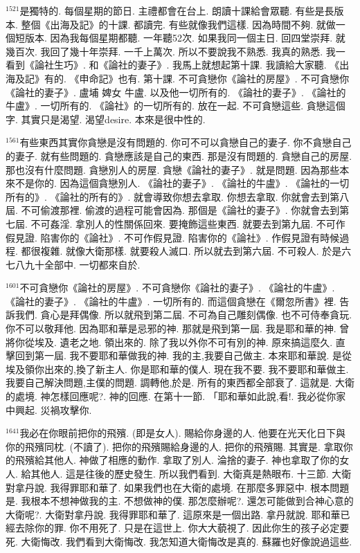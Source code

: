 \documentclass{book}
\begin{document}
$^{1521}$是獨特的.
每個星期的節日.
主禮都會在台上.
朗讀十課給會眾聽.
有些是長版本.
整個《出海及記》的十課.
都讀完.
有些就像我們這樣.
因為時間不夠.
就做一個短版本.
因為我每個星期都聽.
一年聽52次.
如果我同一個主日.
回四堂崇拜.
就幾百次.
我回了幾十年崇拜.
一千上萬次.
所以不要說我不熟悉.
我真的熟悉.
我一看到《論社生巧》.
和《論社的妻子》.
我馬上就想起第十課.
我讀給大家聽.
《出海及記》有的.
《申命記》也有.
第十課.
不可貪戀你《論社的房屋》.
不可貪戀你《論社的妻子》.
盧埔 婢女 牛盧.
以及他一切所有的.
《論社的妻子》.
《論社的牛盧》.
一切所有的.
《論社》的一切所有的.
放在一起.
不可貪戀這些.
貪戀這個字.
其實只是渴望.
渴望desire.
本來是很中性的.

$^{1561}$有些東西其實你貪戀是沒有問題的.
你可不可以貪戀自己的妻子.
你不貪戀自己的妻子.
就有些問題的.
貪戀應該是自己的東西.
那是沒有問題的.
貪戀自己的房屋.
那也沒有什麼問題.
貪戀別人的房屋.
貪戀《論社的妻子》.
就是問題.
因為那些本來不是你的.
因為這個貪戀別人.
《論社的妻子》.
《論社的牛盧》.
《論社的一切所有的》.
《論社的所有的》.
就會導致你想去拿取.
你想去拿取.
你就會去到第八屆.
不可偷渡那裡.
偷渡的過程可能會因為.
那個是《論社的妻子》.
你就會去到第七屆.
不可姦淫.
拿別人的性關係回來.
要掩飾這些東西.
就要去到第九屆.
不可作假見證.
陷害你的《論社》.
不可作假見證.
陷害你的《論社》.
作假見證有時候過程.
都很複雜.
就像大衛那樣.
就要殺人滅口.
所以就去到第六屆.
不可殺人.
於是六七八九十全部中.
一切都來自於.

$^{1601}$不可貪戀你《論社的房屋》.
不可貪戀你《論社的妻子》.
《論社的牛盧》.
《論社的妻子》.
《論社的牛盧》.
一切所有的.
而這個貪戀在《爾忽所書》裡.
告訴我們.
貪心是拜偶像.
所以就飛到第二屆.
不可為自己雕刻偶像.
也不可侍奉貪玩.
你不可以敬拜他.
因為耶和華是忌邪的神.
那就是飛到第一屆.
我是耶和華的神.
曾將你從埃及.
遺老之地.
領出來的.
除了我以外你不可有別的神.
原來搞這麼久.
直擊回到第一屆.
我不要耶和華做我的神.
我的主,我要自己做主.
本來耶和華說.
是從埃及領你出來的,換了新主人.
你是耶和華的僕人.
現在我不要.
我不要耶和華做主.
我要自己解決問題,主僕的問題.
調轉他,於是.
所有的東西都全部衰了.
這就是.
大衛的處境.
神怎樣回應呢?.
神的回應.
在第十一節.
「耶和華如此說,看!.
我必從你家中興起.
災禍攻擊你.

$^{1641}$我必在你眼前把你的飛殯.
(即是女人).
賜給你身邊的人.
他要在光天化日下與你的飛殯同枕.
(不讀了).
把你的飛殯賜給身邊的人.
把你的飛殯賜.
其實是.
拿取你的飛殯給其他人.
神做了相應的動作.
拿取了別人.
淪捨的妻子.
神也拿取了你的女人.
給其他人.
這是往後的歷史發生.
所以我們看到.
大衛真是熱眼布.
十三節.
大衛對拿丹說.
我得罪耶和華了.
如果我們也在大衛的處境.
在那麼多罪惡中.
根本問題是.
我根本不想神做我的主.
不想做神的僕.
那怎麼辦呢?.
還怎可能做到合神心意的大衛呢?.
大衛對拿丹說.
我得罪耶和華了.
這原來是一個出路.
拿丹就說.
耶和華已經去除你的罪.
你不用死了.
只是在這世上.
你大大藐視了.
因此你生的孩子必定要死.
大衛悔改.
我們看到大衛悔改.
我怎知道大衛悔改是真的.
蘇羅也好像說過這些.
\end{document}
